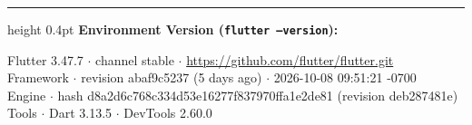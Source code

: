 \documentclass[10pt,a4paper]{article}
\begin{document}
\vspace{0.2cm}
\hrule height 0.4pt
\vspace{0.15cm}
\noindent
{\scriptsize \textbf{Environment Version (\texttt{flutter --version}):}}\\[1pt]
{\fontsize{6.2pt}{7.5pt}\selectfont\ttfamily
Flutter 3.47.7 $\cdot$ channel stable $\cdot$ \url{https://github.com/flutter/flutter.git}\\
Framework $\cdot$ revision abaf9c5237 (5 days ago) $\cdot$ 2026-10-08 09:51:21 -0700\\
Engine $\cdot$ hash d8a2d6c768c334d53e16277f837970ffa1e2de81 (revision deb287481e)\\
Tools $\cdot$ Dart 3.13.5 $\cdot$ DevTools 2.60.0\par
}
\end{document}
